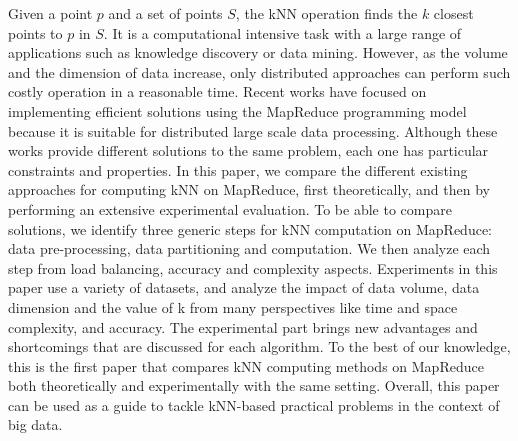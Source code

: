 Given a point $p$ and a set of points $S$, the kNN operation finds the $k$ closest points to $p$ in $S$. It is a computational
intensive task with a large range of applications such as knowledge discovery or data mining. However, as the volume
and the dimension of data increase, only distributed approaches can perform such costly operation in a reasonable time. 
Recent works have focused on implementing efficient solutions using the MapReduce programming model because it is suitable for 
distributed large scale data processing.  Although these works provide
different solutions to the same problem, each one has particular constraints and properties. 
In this paper, we compare the different existing approaches for computing kNN on MapReduce, first theoretically, and then by performing an extensive experimental evaluation. To be able to compare solutions, we identify three generic steps for kNN computation on MapReduce: data pre-processing, data partitioning and computation. We then analyze each step from load balancing, accuracy and complexity aspects. Experiments in this paper use a variety of datasets, and analyze the impact of data volume, data dimension and the value of k from many perspectives like time and space complexity, and accuracy. The experimental part brings new advantages and shortcomings that are discussed for each algorithm. To the best of our knowledge, this is the first paper that compares kNN computing methods on MapReduce both theoretically and experimentally with the same setting. Overall, this paper can be used as a guide to tackle kNN-based practical problems in the context of big data. 
%
%
%

